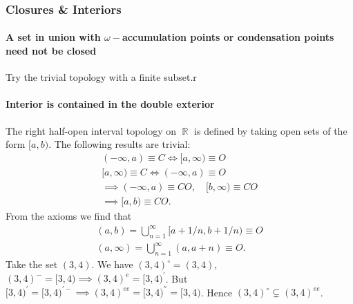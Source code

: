 \documentclass{article}
\DeclareMathOperator\R{\mathbb{R}}
\begin{document}
\subsubsection{Closures \& Interiors}
\paragraph{A set in union with $\omega-$accumulation points or condensation points need not be closed}
Try the trivial topology with a finite subset.r

\paragraph{Interior is contained in the double exterior}
The right half-open interval topology on $\R$ is defined by taking open sets of the form $[a,b)$.
The following results are trivial:
\begin{gather*}
(-\infty, a) \equiv C \iff [a, \infty) \equiv O \\
[a, \infty) \equiv C \iff (-\infty,a) \equiv O \\
\implies (-\infty, a) \equiv CO, \quad [b, \infty) \equiv CO \\
\implies [a,b) \equiv CO.
\end{gather*}
From the axioms we find that
\begin{gather*}
(a,b) = \bigcup_{n=1}^\infty [a+1/n,b+1/n) \equiv O \\
(a,\infty) = \bigcup_{n=1}^\infty (a,a+n) \equiv O.
\end{gather*}
Take the set $(3,4)$.
We have $(3,4)^{\circ} = (3,4)$, ${(3,4)}^{-} = [3,4) \implies {(3,4)}^{e} = {[3,4)}^{'}$.
But $[3,4)^{'} = [3,4)^{'-} \implies (3,4)^{ee} = [3,4)^{''} = [3,4)$. Hence $(3,4)^\circ \subsetneq (3,4)^{ee}$.
\end{document}
